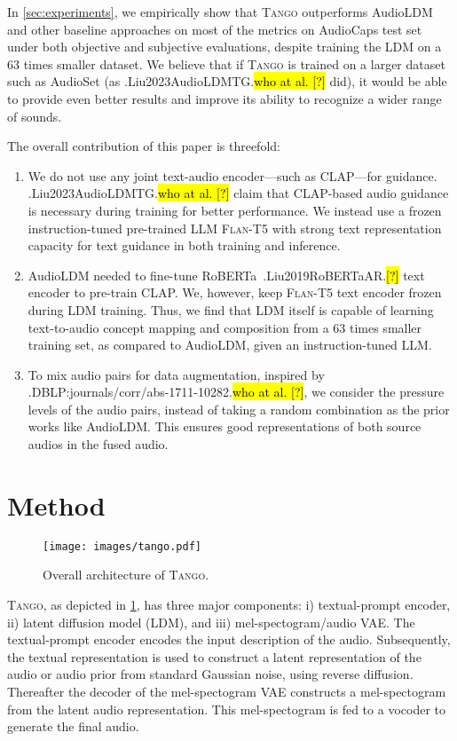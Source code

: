 \documentclass{article}
\newcommand{\model}{\textsc{Tango}}
\let\realcite\cite
\renewcommand{\cite}[1]{\ifx.#1.\hl{[?]}\else\realcite{#1}\fi}
\let\realcitet\citet
\renewcommand{\citet}[1]{\ifx.#1.\hl{who at al. [?]}\else\realcitet{#1}\fi}
\begin{document}
In \cref{sec:experiments}, we empirically show that \model {} outperforms AudioLDM and other baseline approaches on most of the metrics on AudioCaps test set under both objective and subjective evaluations, despite training the LDM on a $63$ times smaller dataset. We believe that if \model{} is trained on a larger dataset such as AudioSet (as \citet{Liu2023AudioLDMTG} did), it would be able to provide even better results and improve its ability to recognize a wider range of sounds.

The overall contribution of this paper is threefold:
\begin{enumerate}[leftmargin=*, wide, labelwidth=0pt, labelindent=0pt]
    \item We do not use any joint text-audio encoder---such as CLAP---for guidance. \citet{Liu2023AudioLDMTG} claim that CLAP-based audio guidance is necessary during training for better performance. We instead use a frozen instruction-tuned pre-trained LLM \textsc{Flan-T5} with strong text representation capacity for text guidance in both training and inference.
    \item AudioLDM needed to fine-tune RoBERTa~\cite{Liu2019RoBERTaAR} text encoder to pre-train CLAP. We, however, keep \textsc{Flan-T5} text encoder frozen during LDM training. Thus, we find that LDM itself is capable of learning text-to-audio concept mapping and composition from a 63 times smaller training set, as compared to AudioLDM, given an instruction-tuned LLM.
    \item To mix audio pairs for data augmentation, inspired by \citet{DBLP:journals/corr/abs-1711-10282}, we consider the pressure levels of the audio pairs, instead of taking a random combination as the prior works like AudioLDM. This ensures good representations of both source audios in the fused audio.
\end{enumerate}





\section{Method}

\begin{figure}
    \centering
    \texttt{[image: images/tango.pdf]}
    \caption{Overall architecture of \model{}.}
    \label{fig:model}
\end{figure}

\model{}, as depicted in \cref{fig:model}, has three major components: i) textual-prompt encoder, ii) latent diffusion model (LDM), and iii) mel-spectogram/audio VAE. The textual-prompt encoder encodes the input description of the audio. Subsequently, the textual representation is used to construct a latent representation of the audio or audio prior from standard Gaussian noise, using reverse diffusion. Thereafter the decoder of the mel-spectogram VAE constructs a mel-spectogram from the latent audio representation. This mel-spectogram is fed to a vocoder to generate the final audio.
\end{document}
